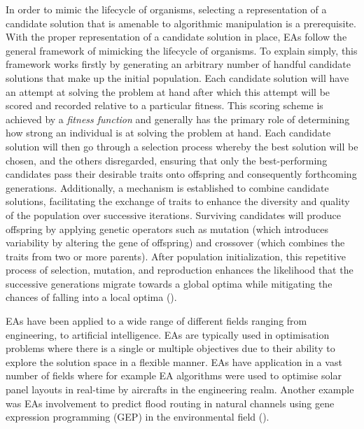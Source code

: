 \noindent In order to mimic the lifecycle of organisms, selecting a representation of a candidate solution that is amenable to algorithmic manipulation is a prerequisite. With the proper representation of a candidate solution in place, EAs follow the general framework of mimicking the lifecycle of organisms. To explain simply, this framework works firstly by generating an arbitrary number of handful candidate solutions that make up the initial population. Each candidate solution will have an attempt at solving the problem at hand after which this attempt will be scored and recorded relative to a particular fitness. This scoring scheme is achieved by a \textit{fitness function} and generally has the primary role of determining how strong an individual is at solving the problem at hand. Each candidate solution will then go through a selection process whereby the best solution will be chosen, and the others disregarded, ensuring that only the best-performing candidates pass their desirable traits onto offspring and consequently forthcoming generations. Additionally, a mechanism is established to combine candidate solutions, facilitating the exchange of traits to enhance the diversity and quality of the population over successive iterations. Surviving candidates will produce offspring by applying genetic operators such as mutation (which introduces variability by altering the gene of offspring) and crossover (which combines the traits from two or more parents). After population initialization, this repetitive process of selection, mutation, and reproduction enhances the likelihood that the successive generations migrate towards a global optima while mitigating the chances of falling into a local optima (\cite{evolutionaryComputingAndNeuralNetworks}). \bigskip

\noindent EAs have been applied to a wide range of different fields ranging from engineering, to artificial intelligence. EAs are typically used in optimisation problems where there is a single or multiple objectives due to their ability to explore the solution space in a flexible manner. EAs have application in a vast number of fields where for example EA algorithms were used to optimise solar panel layouts in real-time by aircrafts in the engineering realm. Another example was EAs involvement to predict flood routing in natural channels using gene expression programming (GEP) in the environmental field (\cite{slowik2020evolutionary}).

